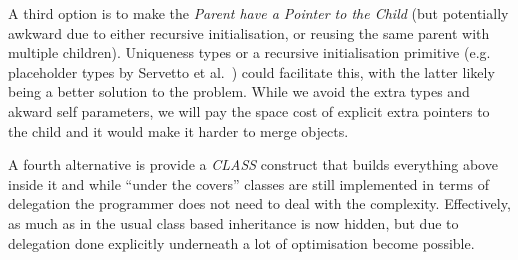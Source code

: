\documentclass[preprint]{sigplanconf}
\begin{document}
A third option is to make the \textit{Parent have a Pointer to the Child} (but potentially awkward due to either recursive initialisation, or reusing the same parent with multiple children). Uniqueness types or a recursive initialisation primitive (e.g. placeholder types by Servetto et al.~\cite{servetto:2013:billion}) could facilitate this, with the latter likely being a better solution to the problem. While we avoid the extra types and akward self parameters, we will pay the space cost of explicit extra pointers to the child and it would make it harder to merge objects.

A fourth alternative is provide a \textit{CLASS} construct that builds everything above inside it and while ``under the covers'' classes are still implemented in terms of delegation the programmer does not need to deal with the complexity. Effectively, as much as in the usual class based inheritance is now hidden, but due to delegation done explicitly underneath a lot of optimisation become possible.

\end{document}
